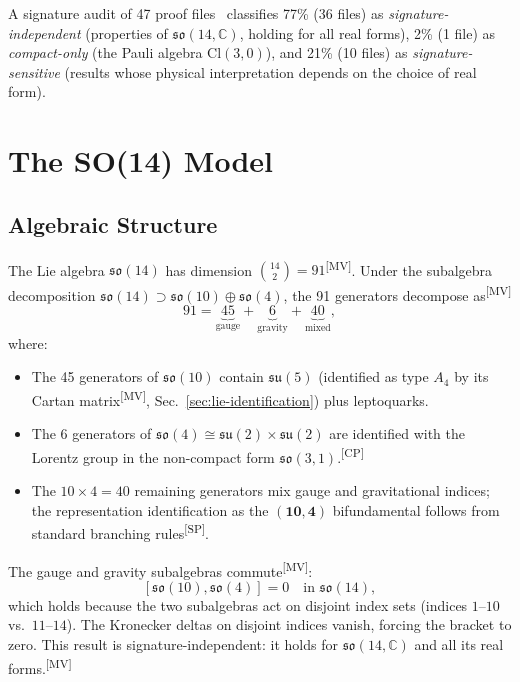 \documentclass[aps,prd,twocolumn,showpacs,preprintnumbers,superscriptaddress,floatfix]{revtex4-2}
\newcommand{\so}{\mathfrak{so}}
\newcommand{\su}{\mathfrak{su}}
\newcommand{\Cl}{\mathrm{Cl}}
\newcommand{\MV}{\textsuperscript{[MV]}}
\newcommand{\CP}{\textsuperscript{[CP]}}
\newcommand{\SP}{\textsuperscript{[SP]}}
\begin{document}
A signature audit of 47 proof files~\cite{uft-github}
classifies 77\% (36 files) as \emph{signature-independent} (properties of
$\so(14,\mathbb{C})$, holding for all real forms), 2\% (1 file) as
\emph{compact-only} (the Pauli algebra $\Cl(3,0)$), and 21\% (10 files) as
\emph{signature-sensitive} (results whose physical interpretation
depends on the choice of real form). %

\section{The SO(14) Model}
\label{sec:model}

\subsection{Algebraic Structure}
\label{sec:algebraic}

The Lie algebra $\so(14)$ has dimension $\binom{14}{2} = 91$\MV.
Under the subalgebra decomposition $\so(14) \supset \so(10) \oplus \so(4)$,
the 91 generators decompose as\MV
\begin{equation}\label{eq:91}
  91 = \underbrace{45}_{\text{gauge}} +
       \underbrace{6}_{\text{gravity}} +
       \underbrace{40}_{\text{mixed}},
\end{equation}
where:
\begin{itemize}
\item The 45 generators of $\so(10)$ contain $\su(5)$ (identified
  as type $A_4$ by its Cartan matrix\MV, Sec.~\ref{sec:lie-identification})
  plus leptoquarks.
\item The 6 generators of $\so(4) \cong \su(2) \times \su(2)$
  are identified with the Lorentz group in the non-compact form
  $\so(3,1)$.\CP
\item The $10 \times 4 = 40$ remaining generators mix gauge and gravitational
  indices; the representation identification as the $(\mathbf{10}, \mathbf{4})$
  bifundamental follows from standard branching rules\SP.
\end{itemize}

The gauge and gravity subalgebras
commute\MV:
\begin{equation}\label{eq:commute}
  [\so(10), \so(4)] = 0 \quad \text{in } \so(14),
\end{equation}
which holds because the two subalgebras act on disjoint index sets
(indices $1$--$10$ vs.\ $11$--$14$).  The Kronecker deltas on
disjoint indices vanish, forcing the bracket to zero.  This result
is signature-independent: it holds for $\so(14,\mathbb{C})$ and
all its real forms.\MV
\end{document}
